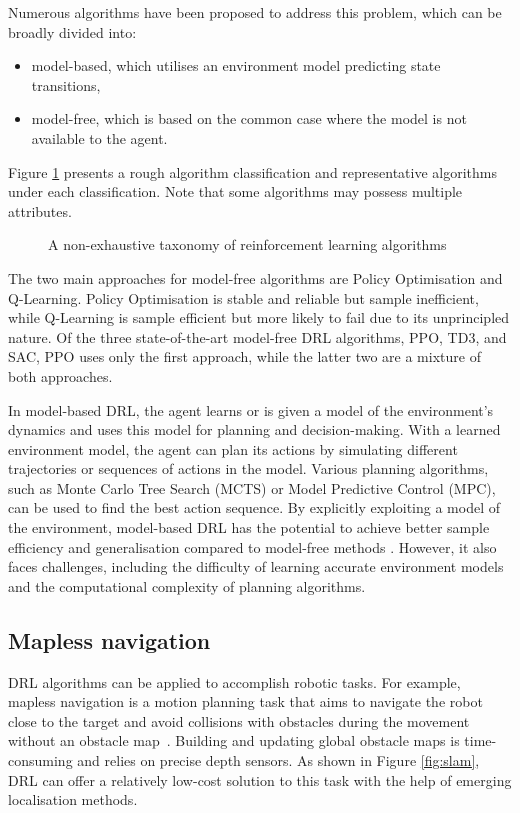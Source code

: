 Numerous algorithms have been proposed to address this problem, which can be broadly divided into:
\begin{itemize}
\item model-based, which utilises an environment model predicting state transitions,
\item model-free, which is based on the common case where the model is not available to the agent.
\end{itemize}
Figure \ref{fig:taxonomy-of-algorithms} presents a rough algorithm classification and representative algorithms under each classification. Note that some algorithms may possess multiple attributes.
\begin{figure}[htbp]
\centering

\caption{A non-exhaustive taxonomy of reinforcement learning algorithms \cite{ref:spinning-up}}
\label{fig:taxonomy-of-algorithms}
\end{figure}

The two main approaches for model-free algorithms are Policy Optimisation and Q-Learning. Policy Optimisation is stable and reliable but sample inefficient, while Q-Learning is sample efficient but more likely to fail due to its unprincipled nature. Of the three state-of-the-art model-free DRL algorithms, PPO, TD3, and SAC, PPO uses only the first approach, while the latter two are a mixture of both approaches.

In model-based DRL, the agent learns or is given a model of the environment's dynamics and uses this model for planning and decision-making. With a learned environment model, the agent can plan its actions by simulating different trajectories or sequences of actions in the model. Various planning algorithms, such as Monte Carlo Tree Search (MCTS) or Model Predictive Control (MPC), can be used to find the best action sequence. By explicitly exploiting a model of the environment, model-based DRL has the potential to achieve better sample efficiency and generalisation compared to model-free methods \cite{ref:model-based-survey}. However, it also faces challenges, including the difficulty of learning accurate environment models and the computational complexity of planning algorithms.

\subsection{Mapless navigation}

DRL algorithms can be applied to accomplish robotic tasks. For example, mapless navigation is a motion planning task that aims to navigate the robot close to the target and avoid collisions with obstacles during the movement without an obstacle map~\cite{ref:virtual2real-drl}. Building and updating global obstacle maps is time-consuming and relies on precise depth sensors. As shown in Figure \ref{fig:slam}, DRL can offer a relatively low-cost solution to this task with the help of emerging localisation methods.

